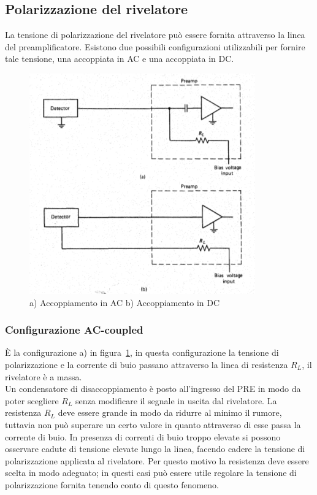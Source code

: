 \subsection{Polarizzazione del rivelatore}
La tensione di polarizzazione del rivelatore pu\`o essere fornita attraverso la linea del preamplificatore.
Esistono due possibili configurazioni utilizzabili per fornire tale tensione, una accoppiata in AC e una accoppiata in DC.
\begin{figure}[htbp]
\begin{center}
	\includegraphics[scale=1]{./Immagini/TensPolarizzazione.png}
\caption{a) Accoppiamento in AC b) Accoppiamento in DC}
\label{fig:tensPolarizzazione}
\end{center}
\end{figure}
\subsubsection{Configurazione AC-coupled}
\`E la configurazione a) in figura~\ref{fig:tensPolarizzazione}, in questa configurazione la tensione di polarizzazione e la corrente di buio passano attraverso
la linea di resistenza $R_L$, il rivelatore \`e a massa.\\
Un condensatore di disaccoppiamento \`e posto all'ingresso del PRE in modo da poter scegliere $R_L$ senza modificare il segnale in uscita dal rivelatore.
La resistenza $R_L$ deve essere grande in modo da ridurre al minimo il rumore, tuttavia non pu\`o superare un certo valore in quanto attraverso di esse passa la corrente
di buio.
In presenza di correnti di buio troppo elevate si possono osservare cadute di tensione elevate lungo la linea, facendo cadere la tensione di polarizzazione applicata al rivelatore.
Per questo motivo la resistenza deve essere scelta in modo adeguato; in questi casi pu\`o essere utile regolare la tensione di polarizzazione fornita tenendo conto di questo fenomeno.
